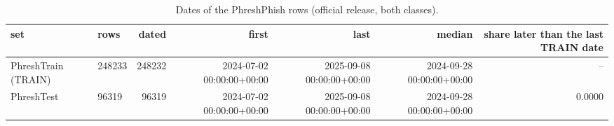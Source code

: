 \begin{table}[t]
\centering
\scriptsize
\caption{Dates of the PhreshPhish rows (official release, both classes).}
\label{tab:rev_R18_phreshphish_date_ranges}
\begin{tabular}{llrrrrr}
\toprule
set & rows & dated & first & last & median & share later than the last TRAIN date \\
\midrule
PhreshTrain (TRAIN) & 248233 & 248232 & 2024-07-02 00:00:00+00:00 & 2025-09-08 00:00:00+00:00 & 2024-09-28 00:00:00+00:00 & -- \\
PhreshTest & 96319 & 96319 & 2024-07-02 00:00:00+00:00 & 2025-09-08 00:00:00+00:00 & 2024-09-28 00:00:00+00:00 & 0.0000 \\
\bottomrule
\end{tabular}
\end{table}